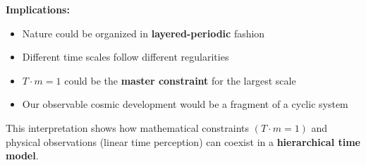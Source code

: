 	\textbf{Implications:}
	\begin{itemize}
		\item Nature could be organized in \textbf{layered-periodic} fashion
		\item Different time scales follow different regularities
		\item $T \cdot m = 1$ could be the \textbf{master constraint} for the largest scale
		\item Our observable cosmic development would be a fragment of a cyclic system
	\end{itemize}
	
	This interpretation shows how mathematical constraints $(T \cdot m = 1)$ and physical observations (linear time perception) can coexist in a \textbf{hierarchical time model}.
	